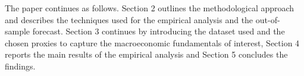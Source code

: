 The paper continues as follows. Section 2 outlines the methodological approach and describes the techniques used for
the empirical analysis and the out-of-sample forecast. Section 3 continues by introducing the dataset used and the chosen proxies to capture the
macroeconomic fundamentals of interest, Section 4 reports the main results of the empirical analysis and Section 5 concludes the findings.